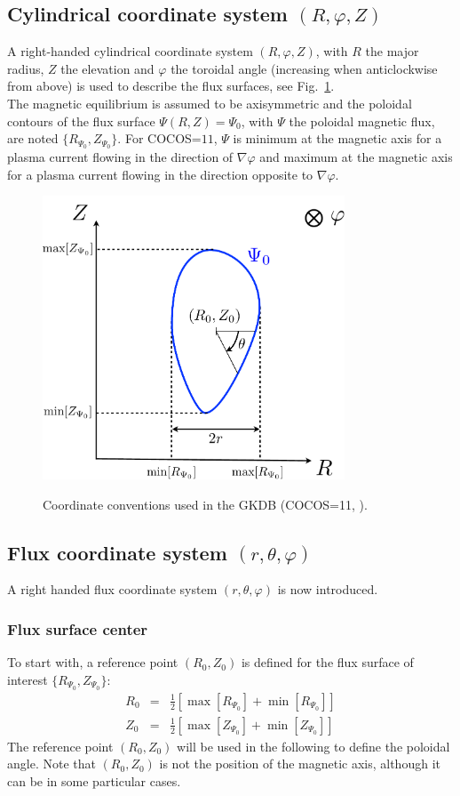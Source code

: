 \documentclass[a4paper]{report}
\begin{document}
\subsection{Cylindrical coordinate system $(R,\varphi,Z)$}
A right-handed cylindrical coordinate system $(R,\varphi,Z)$, with $R$ the major radius, $Z$ the elevation and $\varphi$ the toroidal angle (increasing when anticlockwise from above) is used to describe the flux surfaces, see Fig.~\ref{fig:coord1}. \\
The magnetic equilibrium is assumed to be axisymmetric and the poloidal contours of the flux surface $\Psi(R,Z)=\Psi_0$, with $\Psi$ the poloidal magnetic flux, are noted $\{R_{\Psi_0},Z_{\Psi_0}\}$.
For COCOS=$11$, $\Psi$ is minimum at the magnetic axis for a plasma current flowing in the direction of $\nabla \varphi$ and maximum at the magnetic axis for a plasma current flowing in the direction opposite to $\nabla \varphi$.
\begin{figure}[h]
\begin{center}
  \includegraphics[width=9cm]{COCOS.pdf}\\
  \caption{\label{fig:coord1} Coordinate conventions used in the GKDB (COCOS=11, \cite{Sauter:CPC2013}).}
\end{center}
\end{figure}

\subsection{Flux coordinate system $(r,\theta,\varphi)$}
A right handed flux coordinate system $(r,\theta,\varphi)$ is now introduced.
\subsubsection{Flux surface center}
To start with, a reference point $(R_0,Z_0)$ is defined for the flux surface of interest $\{R_{\Psi_0},Z_{\Psi_0}\}$:
\begin{eqnarray}
 R_0 &=& \frac{1}{2}\left[\max[R_{\Psi_0}] + \min[R_{\Psi_0}]\right]\\
 Z_0 &=& \frac{1}{2}\left[\max[Z_{\Psi_0}] + \min[Z_{\Psi_0}]\right]
\end{eqnarray} 
The reference point  $(R_0,Z_0)$ will be used in the following to define the poloidal angle. Note that $(R_0,Z_0)$ is not the position of the magnetic axis, although it can be in some particular cases. 
\end{document}
